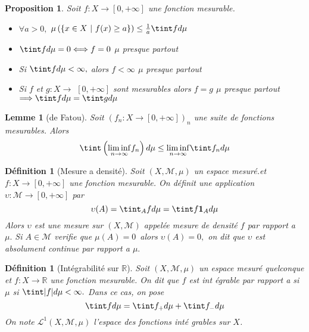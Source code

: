 \documentclass[3pt]{article}
\newtheorem{definition}[theorem]{D\'{e}finition}
\newtheorem{lemma}[theorem]{Lemme}
\newtheorem{proposition}[theorem]{Proposition}
\begin{document}
\begin{proposition}
Soit $f:X\rightarrow \left[ 0,+\infty \right] $ une fonction mesurable.

\begin{itemize}
\item $\forall a>0,$ $\mu \left( \left\{ x\in X\text{ }|\text{ }f(x)\geq
a\right\} \right) \leq \frac{1}{a}\tint fd\mu $

\item $\tint fd\mu =0\Longleftrightarrow f=0$ $\mu $ presque partout

\item Si $\tint fd\mu <\infty ,$ alors $f<\infty $ $\mu $ presque partout

\item Si $f$ et $g:X\rightarrow $ $\left[ 0,+\infty \right] $ sont
mesurables alors $f=g$ $\mu $ presque partout $\Longrightarrow \tint fd\mu
=\tint gd\mu $
\end{itemize}
\end{proposition}

\bigskip

\begin{lemma}[de Fatou]
Soit $(f_{n}:X\rightarrow \left[ 0,+\infty \right] )_{n}$ une suite de
fonctions mesurables. Alors%
\begin{equation*}
\tint \left( \underset{n\rightarrow \infty }{\lim \inf }f_{n}\right) d\mu
\leq \underset{n\rightarrow \infty }{\lim \inf }\tint f_{n}d\mu
\end{equation*}
\end{lemma}

\bigskip

\begin{definition}[Mesure a densit\'{e}]
Soit $(X,\mathcal{M},\mu )$ un espace mesur\'{e}.et $f:X\rightarrow \left[
0,+\infty \right] $ une fonction mesurable. On d\'{e}finit une application $%
\upsilon :\mathcal{M}\rightarrow \left[ 0,+\infty \right] $ par 
\begin{equation*}
\upsilon (A)=\tint_{A}fd\mu =\tint f\mathbf{1}_{A}d\mu
\end{equation*}%
Alors $\upsilon $ est une mesure sur $(X,\mathcal{M})$ appel\'{e}e mesure de
densit\'{e} $f$ par rapport a $\mu .$ Si $A\in \mathcal{M}$ verifie que $\mu
(A)=0$\ alors $\upsilon (A)=0,$ on dit que $\upsilon $ est absolument
continue par rapport a $\mu .$
\end{definition}

\bigskip

\begin{definition}[Int\'{e}grabilit\'{e} sur $\mathbb{R}$]
Soit $(X,\mathcal{M},\mu )$ un espace mesur\'{e} quelconque et $%
f:X\rightarrow \mathbb{R}$ une fonction mesurable. On dit que $f$ est int%
\'{e}grable par rapport a si $\mu $ si $\tint |f|d\mu <\infty .$ Dans ce
cas, on pose 
\begin{equation*}
\tint fd\mu =\tint f_{+}d\mu +\tint f_{-}d\mu
\end{equation*}%
On note $\mathcal{L}^{1}(X,\mathcal{M},\mu )$ l'espace des fonctions int\'{e}%
grables sur $X$.
\end{definition}
\end{document}
